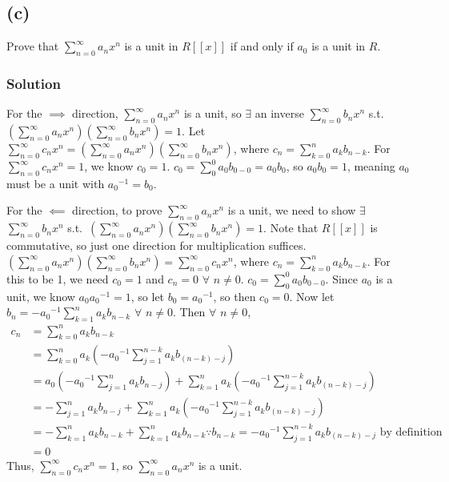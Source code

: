 \documentclass[fleqn]{article}
\begin{document}
        \subsection{(c)}
        Prove that $\sum\limits_{n = 0}^{\infty} a_n x^n$ is a unit in $R[[x]]$ if and only if $a_0$ is a unit in $R$.
            
            \subsubsection{Solution}
            For the $\implies$ direction, $\sum\limits_{n = 0}^{\infty} a_n x^n$ is a unit, so $\exists$ an inverse $\sum\limits_{n = 0}^{\infty} b_n x^n$ s.t.\ $\left(\sum\limits_{n = 0}^{\infty} a_n x^n\right)\left(\sum\limits_{n = 0}^{\infty} b_n x^n\right) = 1$.  Let $\sum\limits_{n = 0}^{\infty} c_n x^n = \left(\sum\limits_{n = 0}^{\infty} a_n x^n\right)\left(\sum\limits_{n = 0}^{\infty} b_n x^n\right)$, where $c_n = \sum\limits_{k = 0}^{n} a_k b_{n - k}$.  For $\sum\limits_{n = 0}^{\infty} c_n x^n = 1$, we know $c_0 = 1$.  $c_0 = \sum\limits_0^0 a_0 b_{0 - 0} = a_0 b_0$, so $a_0 b_0 = 1$, meaning $a_0$ must be a unit with ${a_0}^{-1} = b_0$.
            
            For the $\impliedby$ direction, to prove $\sum\limits_{n = 0}^{\infty} a_n x^n$ is a unit, we need to show $\exists$ $\sum\limits_{n = 0}^{\infty} b_n x^n$ s.t.\ $\left(\sum\limits_{n = 0}^{\infty} a_n x^n\right)\left(\sum\limits_{n = 0}^{\infty} b_n x^n\right) = 1$.  Note that $R[[x]]$ is commutative, so just one direction for multiplication suffices.  $\left(\sum\limits_{n = 0}^{\infty} a_n x^n\right)\left(\sum\limits_{n = 0}^{\infty} b_n x^n\right) = \sum\limits_{n = 0}^{\infty} c_n x^n$, where $c_n = \sum\limits_{k = 0}^{n} a_k b_{n - k}$.  For this to be 1, we need $c_0 = 1$ and $c_n = 0$ $\forall$ $n \neq 0$.  $c_0 = \sum\limits_0^0 a_0 b_{0 - 0}$.  Since $a_0$ is a unit, we know $a_0 {a_0}^{-1} = 1$, so let $b_0 = {a_0}^{-1}$, so then $c_0 = 0$.  Now let $b_n = -{a_0}^{-1} \sum\limits_{k = 1}^{n} a_k b_{n - k}$ $\forall$ $n \neq 0$.  Then $\forall$ $n \neq 0$, 
            \begin{align}
                c_n &= \sum\limits_{k = 0}^{n} a_k b_{n - k} \\
                    &= \sum\limits_{k = 0}^{n} a_k \left(-{a_0}^{-1} \sum\limits_{j = 1}^{n - k} a_k b_{(n - k) - j}\right) \\
                    &= a_0 \left(-{a_0}^{-1} \sum\limits_{j = 1}^{n} a_k b_{n - j}\right) + \sum\limits_{k = 1}^{n} a_k \left(-{a_0}^{-1} \sum\limits_{j = 1}^{n - k} a_k b_{(n - k) - j}\right) \\
                    &= -\sum\limits_{j = 1}^{n} a_k b_{n - j} + \sum\limits_{k = 1}^{n} a_k \left(-{a_0}^{-1} \sum\limits_{j = 1}^{n - k} a_k b_{(n - k) - j}\right) \\
                    &= -\sum\limits_{k = 1}^{n} a_k b_{n - k} + \sum\limits_{k = 1}^{n} a_k b_{n - k} \because{} b_{n - k} = -{a_0}^{-1} \sum\limits_{j = 1}^{n - k} a_k b_{(n - k) - j} \text{ by definition}\\
                    &= 0
            \end{align}
            Thus, $\sum\limits_{n = 0}^{\infty} c_n x^n = 1$, so $\sum\limits_{n = 0}^{\infty} a_n x^n$ is a unit.
    
\end{document}
